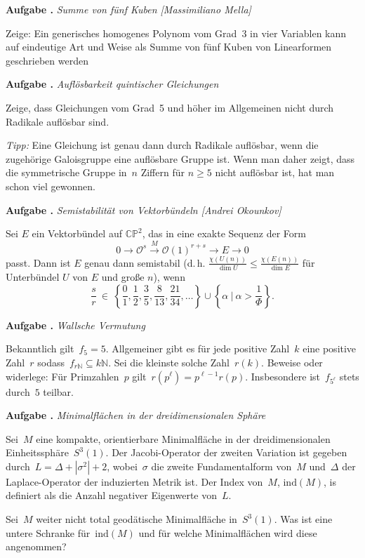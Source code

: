 \documentclass[a4paper,ngerman,twoside]{scrartcl}
\newlength{\aufgabenskip}
\newcounter{aufgabennummer}
\newenvironment{aufgabe}[1]{
  \addtocounter{aufgabennummer}{1}
  \textbf{Aufgabe \theaufgabennummer.} \emph{#1} \par
}{\vspace{\aufgabenskip}}
\newcommand{\NN}{\mathbb{N}}
\begin{document}
\begin{aufgabe}{Summe von fünf Kuben [Massimiliano Mella]}
Zeige: Ein generisches homogenes Polynom vom Grad~3 in vier Variablen kann auf
eindeutige Art und Weise als Summe von fünf Kuben von Linearformen geschrieben werden
\end{aufgabe}

\begin{aufgabe}{Auflösbarkeit quintischer Gleichungen}
Zeige, dass Gleichungen vom Grad~5 und höher im Allgemeinen nicht durch
Radikale auflösbar sind.

\emph{Tipp:} Eine Gleichung ist genau dann durch Radikale auflösbar, wenn die
zugehörige Galoisgruppe eine auflösbare Gruppe ist. Wenn man daher zeigt, dass
die symmetrische Gruppe in~$n$ Ziffern für $n \geq 5$ nicht auflösbar ist, hat
man schon viel gewonnen.
\end{aufgabe}

\begin{aufgabe}{Semistabilität von Vektorbündeln [Andrei Okounkov]}
Sei $E$ ein Vektorbündel auf $\mathbb{CP}^2$, das in eine exakte Sequenz der
Form
\[
0 \longrightarrow \mathcal{O}^s \stackrel{M}{\longrightarrow} \mathcal{O}(1)^{r+s} \longrightarrow E \longrightarrow 0
\]
passt. Dann ist $E$ genau dann semistabil (d.\,h. $\tfrac{\chi(U(n))}{\dim U}\leq\tfrac{\chi(E(n))}{\dim E}$ für Unterbündel $U$ von $E$ und große $n$), wenn 
\[
\frac{s}{r}\ \in\
\left\{\frac{0}{1},\frac{1}{2},\frac{3}{5},\frac{8}{13},\frac{21}{34},\ldots
\right\} \cup \left\{ \alpha\ |\ \alpha > \frac{1}{\Phi} \right\}. \]
\end{aufgabe}
\vspace*{-1em}

\begin{aufgabe}{Wallsche Vermutung}
Bekanntlich gilt~$f_5 = 5$. Allgemeiner gibt es für jede positive Zahl~$k$ eine
positive Zahl~$r$ sodass~$f_{r \NN} \subseteq k \NN$. Sei die kleinste solche
Zahl~$r(k)$. Beweise oder widerlege: Für Primzahlen~$p$ gilt~$r(p^\ell) =
p^{\ell-1} r(p)$. Insbesondere ist~$f_{5^\ell}$ stets durch~$5$ teilbar.
\end{aufgabe}

\begin{aufgabe}{Minimalflächen in der dreidimensionalen Sphäre}
Sei~$M$ eine kompakte, orientierbare Minimalfläche in der dreidimensionalen
Einheitssphäre~$S^3(1)$. Der Jacobi-Operator der zweiten Variation ist
gegeben durch~$L=\Delta+|\sigma^2|+2$, wobei~$\sigma$ die zweite
Fundamentalform von~$M$ und~$\Delta$ der Laplace-Operator der induzierten
Metrik ist. Der Index von~$M$, $\mathrm{ind}(M)$, is definiert als die Anzahl
negativer Eigenwerte von~$L$.

Sei~$M$ weiter nicht total geodätische Minimalfläche in~$S^3(1)$. Was ist
eine untere Schranke für~$\mathrm{ind}(M)$ und für welche Minimalflächen wird diese
angenommen?
\end{aufgabe}
\end{document}
